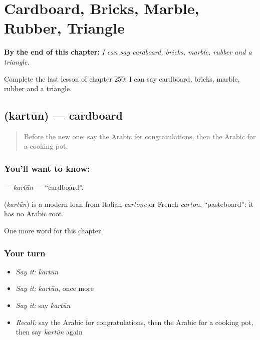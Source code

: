 
\chapter{Cardboard, Bricks, Marble, Rubber, Triangle}
\label{ch:ar-cardboard-bricks-marble-rubber-triangle}

\begin{chapteropening}
\textbf{By the end of this chapter:} \emph{I can say cardboard, bricks, marble, rubber and a triangle.}

Complete the last lesson of chapter 250: I can say cardboard, bricks, marble, rubber and a triangle.
\end{chapteropening}

\section[\texorpdfstring{\ar{كرتون} (kartūn)}{كرتون (kartūn)}]{ (kartūn) — cardboard}

\label{lesson:AR-C250-kartun}



\begin{quote}
Before the new one: say the Arabic for congratulations, then the Arabic for a cooking pot.
\end{quote}

\subsection*{You'll want to know: }
\textbf{} — \emph{kartūn} — \textquotedblleft{}cardboard\textquotedblright{}.

\begin{cousinweb}
\textbf{} (\emph{kartūn}) is a modern loan from Italian \emph{cartone} or French \emph{carton}, \textquotedblleft{}pasteboard\textquotedblright{}; it has no Arabic root.
\end{cousinweb}

\begin{grammarlens}[title={What you've built}]
One more word for this chapter.
\end{grammarlens}

\subsection*{Your turn}
\begin{itemize}
\raggedright
  \item \emph{Say it:} \emph{kartūn}
  \item \emph{Say it:} \emph{kartūn}, once more
  \item \emph{Say it:} say \emph{kartūn}
  \item \emph{Recall:} say the Arabic for congratulations, then the Arabic for a cooking pot, then say \emph{kartūn} again
\end{itemize}


